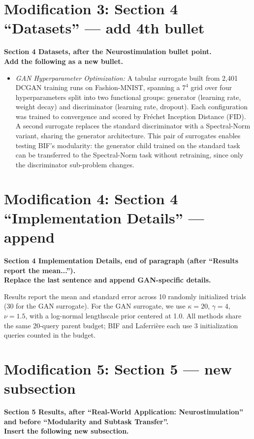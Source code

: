 \documentclass[11pt]{article}
\newcommand{\modloc}[1]{\noindent\colorbox{yellow!30}{\parbox{\dimexpr\textwidth-2\fboxsep}{%
\textbf{#1}}}\medskip}
\begin{document}
\section*{Modification 3: Section 4 ``Datasets'' --- add 4th bullet}
\modloc{Section 4 Datasets, after the Neurostimulation bullet point.\\
Add the following as a new bullet.}

\begin{itemize}
\item \textit{GAN Hyperparameter Optimization:} A tabular surrogate built from 2,401
DCGAN training runs on Fashion-MNIST, spanning a $7^4$ grid over four
hyperparameters split into two functional groups: generator
(learning rate, weight decay) and discriminator (learning rate, dropout).
Each configuration was trained to convergence and scored by Fr\'echet Inception
Distance (FID).
A second surrogate replaces the standard discriminator with a
Spectral-Norm variant, sharing the generator architecture.
This pair of surrogates enables testing BIF's modularity:
the generator child trained on the standard task can be transferred
to the Spectral-Norm task without retraining, since only the
discriminator sub-problem changes.
\end{itemize}

\section*{Modification 4: Section 4 ``Implementation Details'' --- append}
\modloc{Section 4 Implementation Details, end of paragraph (after ``Results report the mean...'').\\
Replace the last sentence and append GAN-specific details.}

Results report the mean and standard error across 10 randomly
initialized trials (30 for the GAN surrogate).
For the GAN surrogate, we use $\kappa\!=\!20$, $\gamma\!=\!4$,
$\nu\!=\!1.5$, with a log-normal lengthscale prior centered at 1.0.
All methods share the same 20-query parent budget;
BIF and Laferri\`ere each use 3 initialization queries
counted in the budget.

\section*{Modification 5: Section 5 --- new subsection}
\modloc{Section 5 Results, after ``Real-World Application: Neurostimulation'' and
before ``Modularity and Subtask Transfer''.\\
Insert the following new subsection.}
\end{document}
